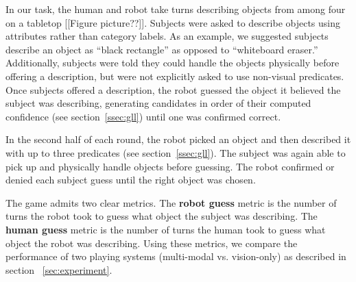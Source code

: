 In our \ispy task, the human and robot take turns describing objects from among
four on a tabletop [[Figure picture??]].  Subjects were asked to describe
objects using attributes rather than category labels.  As an example, we
suggested subjects describe an object as ``black rectangle'' as opposed to
``whiteboard eraser.''  Additionally, subjects were told they could handle the
objects physically before offering a description, but were not explicitly asked
to use non-visual predicates.  Once subjects offered a description, the robot
guessed the object it believed the subject was describing, generating
candidates in order of their computed confidence (see section~\ref{ssec:gll})
until one was confirmed correct.

In the second half of each round, the robot picked an object and then described
it with up to three predicates (see section~\ref{ssec:gll}).  The subject was
again able to pick up and physically handle objects before guessing.  The robot
confirmed or denied each subject guess until the right object was chosen.

The \ispy game admits two clear metrics.  The \textbf{robot guess} metric is
the number of turns the robot took to guess what object the subject was
describing.  The \textbf{human guess} metric is the number of turns the human
took to guess what object the robot was describing.  Using these metrics, we
compare the performance of two \ispy playing systems (multi-modal
vs. vision-only) as described in section ~\ref{sec:experiment}.
